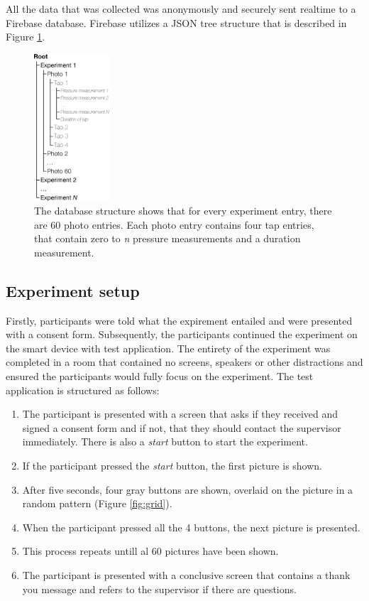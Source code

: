 \documentclass{sigchi}
\begin{document}
All the data that was collected was anonymously and securely sent realtime to a Firebase \cite{google:firebase} database. Firebase utilizes a JSON \cite{json} tree structure that is described in Figure \ref{fig:datastructure}.
\begin{figure}[h]
    \centering
    \includegraphics[width=0.25\textwidth]{images/Datastructure.eps}
    \caption{The database structure shows that for every experiment entry, there are 60 photo entries. Each photo entry contains four tap entries, that contain zero to \textit{n} pressure measurements and a duration measurement.}
    \label{fig:datastructure}
\end{figure}


\subsection{Experiment setup} %
\label{sub:experiment_setup}
Firstly, participants were told what the expirement entailed and were presented with a consent form. Subsequently, the participants continued the experiment on the smart device with test application. The entirety of the experiment was completed in a room that contained no screens, speakers or other distractions and ensured the participants would fully focus on the experiment. The test application is structured as follows:
\begin{enumerate}
  \item The participant is presented with a screen that asks if they received and signed a consent form and if not, that they should contact the supervisor immediately. There is also a \textit{start} button to start the experiment.
  \item If the participant pressed the \textit{start} button, the first picture is shown.
  \item After five seconds, four gray buttons are shown, overlaid on the picture in a random pattern (Figure \ref{fig:grid}).
  \item When the participant pressed all the 4 buttons, the next picture is presented.
  \item This process repeats untill al 60 pictures have been shown.
  \item The participant is presented with a conclusive screen that contains a thank you message and refers to the supervisor if there are questions.
\end{enumerate}
\end{document}
